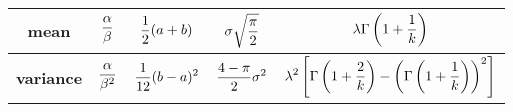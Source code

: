 \begin{landscape}
\begin{center}
\begin{tabular}{c|c|c|c|c}
				\hline
				\textbf{mean} &
				\parbox{3cm}{$\begin{aligned}
					\frac{\alpha}{\beta}\notag
				\end{aligned}$}
				&
				\parbox{3cm}{$\begin{aligned}
					\frac{1}{2}(a+b)\notag
					\end{aligned}$}
				&
				\parbox{3cm}{$\begin{aligned}
					\sigma\sqrt{\frac{\pi}{2}}\notag
				\end{aligned}$}
				& 
				\parbox{3cm}{$\begin{aligned}
					\lambda\Gamma\left(1+\frac{1}{k}\right)\notag
				\end{aligned}$}
				\\
				\hline
				\textbf{variance} &
				\parbox{3cm}{$\begin{aligned}
					\frac{\alpha}{\beta^2}\notag
				\end{aligned}$}
				&
				\parbox{3cm}{$\begin{aligned}
					\frac{1}{12}(b-a)^2\notag
					\end{aligned}$}
				&
				\parbox{3cm}{$\begin{aligned}
						\frac{4-\pi}{2}\sigma^2\notag
				\end{aligned}$}
				&
				\parbox{3cm}{$\begin{aligned}
					\lambda^2\left[\Gamma\left(1+\frac{2}{k}\right)-\left(\Gamma\left(1+\frac{1}{k}\right)\right)^2\right]\notag
				\end{aligned}$}
				 \\
			\end{tabular}
		\end{center}
	\end{landscape}